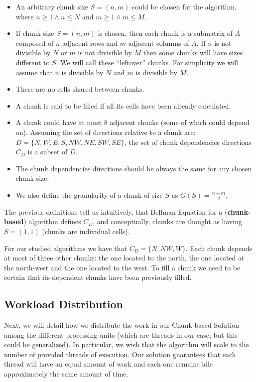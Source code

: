 \documentclass[journal]{IEEEtran}
\begin{document}
\begin{itemize}
    \item An arbitrary chunk size $S = (n, m)$ could be chosen for the algorithm, where $n \geq 1 \land n \leq N$ and $m \geq 1 \land m \leq M$.
    \item If chunk size $S = (n, m)$ is chosen, then each chunk is a submatrix of $A$ composed of $n$ adjacent rows and $m$ adjacent columns of $A$. If $n$ is not divisible by $N$ or $m$ is not divisible by $M$ then some chunks will have sizes different to $S$. We will call these ``leftover'' chunks. For simplicity we will assume that $n$ is divisible by $N$ and $m$ is divisible by $M$.
    \item There are no cells shared between chunks.
    \item A chunk is said to be filled if all its cells have been already calculated.
    \item A chunk could have at most 8 adjacent chunks (some of which could depend on). Assuming the set of directions relative to a chunk are: $D = \{ N, W, E, S, NW, NE, SW, SE \}$, the set of chunk dependencies directions $C_D$ is a subset of $D$.
    \item The chunk dependencies directions should be always the same for any chosen chunk size.
    \item We also define the granularity of a chunk of size $S$ as $G(S) = \frac{n+m}{2}$.
\end{itemize}

The previous definitions tell us intuitively, that Bellman Equation for a (\textbf{chunk-based}) algorithm defines $C_D$, and conceptually, chunks are thought as having $S = (1, 1)$ (chunks are individual cells).

For our studied algorithms we have that $C_D = \{N, NW, W\}$. Each chunk depends at most of three other chunks: the one located to the north, the one located at the north-west and the one located to the west. To fill a chunk we need to be certain that its dependent chunks have been previously filled.

\subsection{Workload Distribution}

Next, we will detail how we distribute the work in our Chunk-based Solution among the different processing units (which are threads in our case, but this could be generalized). In particular, we wish that the algorithm will scale to the number of provided threads of execution. Our solution guarantees that each thread will have an equal amount of work and each one remains idle approximately the same amount of time.
\end{document}
